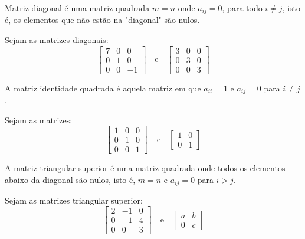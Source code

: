 \begin{df}
	Matriz diagonal é uma matriz quadrada $m=n$ onde $a_{ij}=0$, para todo $i\neq j$, isto é, os elementos que não estão na "diagonal" são nulos.
\end{df}
\begin{ex}
	Sejam as matrizes diagonais:\\
	\begin{equation*}
	\begin{bmatrix}
	7   & 0 & 0 \\
	0   & 1 & 0 \\
	0   & 0 & -1
	\end{bmatrix}\quad \text{e} \quad	\begin{bmatrix}
	3   & 0 & 0 \\
	0   & 3 & 0 \\
	0   & 0 & 3 
	\end{bmatrix}
	\end{equation*}
\end{ex}
\begin{df}
	A matriz identidade quadrada é aquela matriz em que $a_{ii}=1$ e $a_{ij}=0$ para $i\neq j$.
\end{df}
\begin{ex}
	Sejam as matrizes:\\
	\begin{equation*}
	\begin{bmatrix}
	1   & 0 & 0 \\
	0   & 1 & 0 \\
	0   & 0 & 1
	\end{bmatrix}\quad \text{e}\quad \begin{bmatrix}
	1  & 0 \\
	0  & 1
	\end{bmatrix}
	\end{equation*}
\end{ex}
\begin{df}
	A matriz triangular superior é uma matriz quadrada onde todos os elementos abaixo da diagonal são nulos, isto é, $m=n$ e $a_{ij}=0$ para $i>j$.
\end{df}
\begin{ex}
	Sejam as matrizes triangular superior:\\
	\begin{equation*}
     \begin{bmatrix}
	2   & -1 & 0 \\
	0   & -1 & 4 \\
	0   & 0  & 3
	\end{bmatrix}\quad \text{e} \quad
	\begin{bmatrix}
	a  & b \\
	0  & c
	\end{bmatrix}
	\end{equation*} 
		 
\end{ex}
